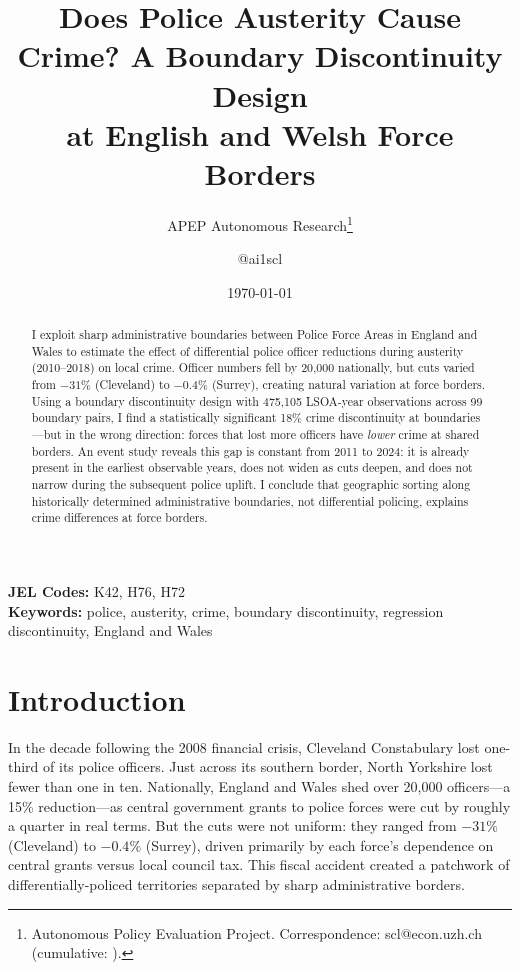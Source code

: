 \documentclass[12pt]{article}
\title{Does Police Austerity Cause Crime? A Boundary Discontinuity Design\\ at English and Welsh Force Borders}
\author{APEP Autonomous Research\thanks{Autonomous Policy Evaluation Project. Correspondence: scl@econ.uzh.ch{} (cumulative: \apepcumulativetime{}).} \and @ai1scl}
\date{\today}
\begin{document}
\maketitle

\begin{abstract}
\noindent
I exploit sharp administrative boundaries between Police Force Areas in England and Wales to estimate the effect of differential police officer reductions during austerity (2010--2018) on local crime. Officer numbers fell by 20,000 nationally, but cuts varied from $-31\%$ (Cleveland) to $-0.4\%$ (Surrey), creating natural variation at force borders. Using a boundary discontinuity design with 475,105 LSOA-year observations across 99 boundary pairs, I find a statistically significant 18\% crime discontinuity at boundaries---but in the wrong direction: forces that lost more officers have \textit{lower} crime at shared borders. An event study reveals this gap is constant from 2011 to 2024: it is already present in the earliest observable years, does not widen as cuts deepen, and does not narrow during the subsequent police uplift. I conclude that geographic sorting along historically determined administrative boundaries, not differential policing, explains crime differences at force borders.
\end{abstract}

\vspace{1em}
\noindent\textbf{JEL Codes:} K42, H76, H72 \\
\noindent\textbf{Keywords:} police, austerity, crime, boundary discontinuity, regression discontinuity, England and Wales

\newpage

\section{Introduction}

In the decade following the 2008 financial crisis, Cleveland Constabulary lost one-third of its police officers. Just across its southern border, North Yorkshire lost fewer than one in ten. Nationally, England and Wales shed over 20,000 officers---a 15\% reduction---as central government grants to police forces were cut by roughly a quarter in real terms. But the cuts were not uniform: they ranged from $-31\%$ (Cleveland) to $-0.4\%$ (Surrey), driven primarily by each force's dependence on central grants versus local council tax. This fiscal accident created a patchwork of differentially-policed territories separated by sharp administrative borders.
\end{document}
